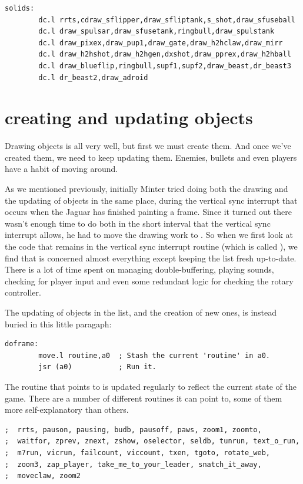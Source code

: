 \begin{lstlisting}
solids: 
        dc.l rrts,cdraw_sflipper,draw_sfliptank,s_shot,draw_sfuseball
        dc.l draw_spulsar,draw_sfusetank,ringbull,draw_spulstank
        dc.l draw_pixex,draw_pup1,draw_gate,draw_h2hclaw,draw_mirr
        dc.l draw_h2hshot,draw_h2hgen,dxshot,draw_pprex,draw_h2hball
        dc.l draw_blueflip,ringbull,supf1,supf2,draw_beast,dr_beast3
        dc.l dr_beast2,draw_adroid            
\end{lstlisting}

\label{sec:mainloop1}
\section*{creating and updating objects}
Drawing objects is all very well, but first we must create them. And once we've
created them, we need to keep updating them. Enemies, bullets and even players
have a habit of moving around. 

As we mentioned previously, initially Minter tried doing both the drawing and the
updating of objects in the same place, during the vertical sync interrupt that
occurs when the Jaguar has finished painting a frame. Since it turned out there
wasn't enough time to do both in the short interval that the vertical sync interrupt
allows, he had to move the drawing work to . So when we first look at
the code that remains in the vertical sync interrupt routine (which is called
), we find that is concerned almost everything except keeping 
the  list fresh up-to-date. There is a lot of time spent
on managing double-buffering, playing sounds, checking for player input and even some
redundant logic for checking the rotary controller.

The updating of objects in the  list, and the creation of new ones,
is instead buried in this little paragaph:
\begin{lstlisting}
doframe:
        move.l routine,a0  ; Stash the current 'routine' in a0.
        jsr (a0)           ; Run it.
\end{lstlisting}

The routine that  points to is updated regularly to reflect the current
state of the game. There are a number of different routines it can point to, some of 
them more self-explanatory than others.
\begin{lstlisting}
;  rrts, pauson, pausing, budb, pausoff, paws, zoom1, zoomto,
;  waitfor, zprev, znext, zshow, oselector, seldb, tunrun, text_o_run,
;  m7run, vicrun, failcount, viccount, txen, tgoto, rotate_web,
;  zoom3, zap_player, take_me_to_your_leader, snatch_it_away,
;  moveclaw, zoom2
\end{lstlisting}

